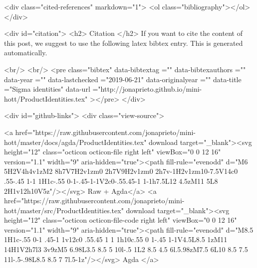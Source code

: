   <div class="cited-references" markdown="1">
  <ol class="bibliography"></ol>
  </div>


  
  <div id="citation">
  <h2> Citation </h2>
  If you want to cite the content of this post,
  we suggest to use the following latex bibtex entry.
  This is generated automatically.

  <br/>
  <br/>
  <pre class="bibtex"
       data-bibtextag =""
       data-bibtexauthors =""
       data-year =""
       data-lastchecked ="2019-06-21"
       data-originalyear =""
       data-title ="Sigma identities"
       data-url ="http://jonaprieto.github.io/mini-hott/ProductIdentities.tex"
  ></pre>
  </div>
  

  <div id="github-links">
    <div class="view-source">
      
        <a href="https://raw.githubusercontent.com/jonaprieto/mini-hott/master/docs/agda/ProductIdentities.tex" download target="_blank"><svg height="12" class="octicon octicon-file right left" viewBox="0 0 12 16" version="1.1" width="9" aria-hidden="true"><path fill-rule="evenodd" d="M6 5H2V4h4v1zM2 8h7V7H2v1zm0 2h7V9H2v1zm0 2h7v-1H2v1zm10-7.5V14c0 .55-.45 1-1 1H1c-.55 0-1-.45-1-1V2c0-.55.45-1 1-1h7.5L12 4.5zM11 5L8 2H1v12h10V5z"/></svg> Raw + Agda</a>
        <a href="https://raw.githubusercontent.com/jonaprieto/mini-hott/master/src/ProductIdentities.tex" download target="_blank"><svg height="12" class="octicon octicon-file-code right left" viewBox="0 0 12 16" version="1.1" width="9" aria-hidden="true"><path fill-rule="evenodd" d="M8.5 1H1c-.55 0-1 .45-1 1v12c0 .55.45 1 1 1h10c.55 0 1-.45 1-1V4.5L8.5 1zM11 14H1V2h7l3 3v9zM5 6.98L3.5 8.5 5 10l-.5 1L2 8.5 4.5 6l.5.98zM7.5 6L10 8.5 7.5 11l-.5-.98L8.5 8.5 7 7l.5-1z"/></svg> Agda </a>
      
